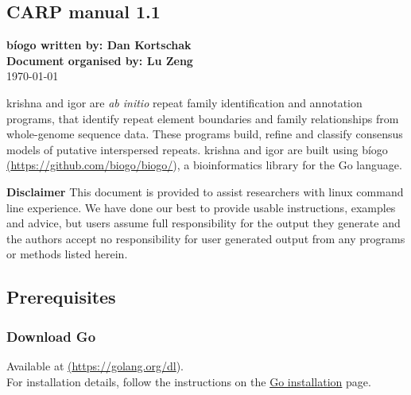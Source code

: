 \documentclass[12pt]{article}
\begin{document}
 \sloppy

\author{Author Name}
\date{Day Month Year}



\begin{center}
	\section{CARP manual 1.1}
	\noindent\textbf{b\'iogo written by: Dan Kortschak} \\
	\textbf{Document organised by: Lu Zeng} \\
	\today
\end{center}

\noindent krishna and igor are \textit{ab initio} repeat family identification and annotation programs, that  identify repeat element boundaries and family relationships from whole-genome sequence data. These programs build, refine and classify consensus models of putative interspersed repeats. krishna and igor are built using b\'iogo \href{<url>}(\url{https://github.com/biogo/biogo/}), a bioinformatics library for the Go language.  

\noindent \textbf{Disclaimer} This document is provided to assist researchers with linux command line experience.  We have done our best to provide usable instructions, examples and advice, but users assume full responsibility for the output they generate and the authors accept no responsibility for user generated output from any programs or methods listed herein.  


\subsection{{Prerequisites}}

\subsubsection{ Download Go }
Available at \href{<url>} (\url{https://golang.org/dl}).\\
For installation details, follow the instructions on the \href{https://golang.org/doc/install#install} {\color{blue}Go installation} page. 
\end{document}
